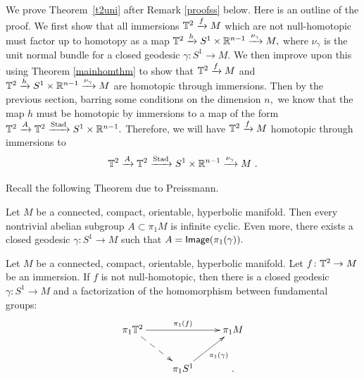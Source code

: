 We prove Theorem~\ref{t2uni} after Remark \ref{proofss} below.
Here is an outline of the proof.
We first show that all immersions $\mathbb T^{2} \xrightarrow{f} M$ which are not null-homotopic must factor up to homotopy as a map $\mathbb T^{2} \xrightarrow{h} S^{1} \times \mathbb R^{n - 1} \xrightarrow{\nu_{\gamma}} M,$ where $\nu_{\gamma}$ is the unit normal bundle for a closed geodesic $\gamma: S^{1} \rightarrow M.$ We then improve upon this using Theorem \ref{mainhomthm} to show that $\mathbb T^{2} \xrightarrow{f} M$ and $\mathbb T^{2} \xrightarrow{h} S^{1} \times \mathbb R^{n - 1} \xrightarrow{\nu_{\gamma}} M$ are homotopic through immersions.
Then by the previous section, barring some conditions on the dimension $n,$ we know that the map $h$ must be homotopic by immersions to a map of the form $\mathbb T^{2} \xrightarrow{A} \mathbb T^{2} \xrightarrow{\rm Stad} S^{1} \times \mathbb R^{n - 1}.$ Therefore, we will have $\mathbb T^{2} \xrightarrow{f} M$ homotopic through immersions to
\[
\mathbb T^{2} \xrightarrow{A} \mathbb T^{2} \xrightarrow{\rm Stad} S^{1} \times \mathbb R^{n - 1} \xrightarrow{\nu_{\gamma}} M~.
\]


Recall the following Theorem due to Preissmann.
\begin{theorem}
\label{tP}
Let $M$ be a connected, compact, orientable, hyperbolic manifold. Then every nontrivial abelian subgroup $A \subset \pi_{1}M$ is infinite cyclic. Even more, there exists a closed geodesic $\gamma: S^{1} \rightarrow M$ such that $A = {\sf Image}(\pi_{1}(\gamma)).$
\end{theorem}



\begin{cor}
\label{t1uni}
Let $M$ be a connected, compact, orientable, hyperbolic manifold.
Let $f \colon \mathbb T^2 \to M$ be an immersion.
If $f$ is not null-homotopic, then there is a closed geodesic $\gamma \colon S^1 \to M$ and a factorization of the homomorphism between fundamental groups:
\[
\xymatrix{
\pi_1\TT^2
\ar[rr]^-{\pi_1(f)}
\ar@{-->}[dr]
&&
\pi_1M
\\
&
\pi_1S^1
\ar[ur]_-{\pi_1(\gamma)}
&
.
}
\]

\end{cor}


